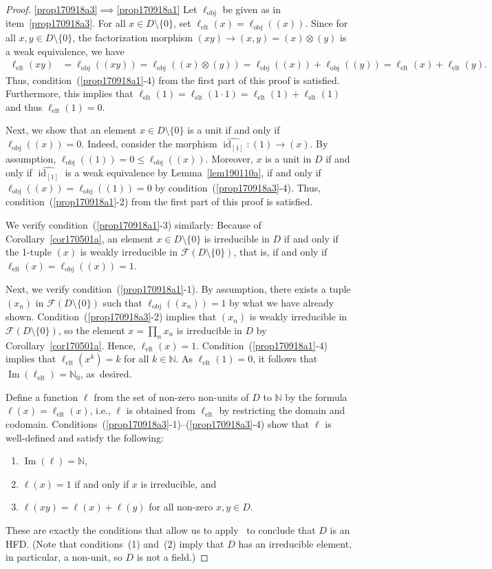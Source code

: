 \documentclass[reqno]{amsart}
\theoremstyle{plain}
\theoremstyle{definition}
\newcommand{\cat}[1]{\mathcal{#1}}
\newcommand{\catf}{\cat{F}}
\newcommand{\id}{\operatorname{id}}
\newcommand{\im}{\operatorname{Im}}
\newcommand{\bbn}{\mathbb{N}}
\renewcommand{\leq}{\leqslant}
\numberwithin{equation}{lem}
\newcommand{\zaks}[1]{\ell_{\text{#1}}}
\newcommand{\zaksobj}{\zaks{obj}}
\newcommand{\zakselt}{\zaks{elt}}
\begin{document}
\begin{proof}
\eqref{prop170918a3}$\implies$\eqref{prop170918a1}
Let $\zaksobj$ be given as in item~\eqref{prop170918a3}.
For all $x\in D\setminus\{0\}$, set $\zakselt(x)=\zaksobj((x))$.
Since for all $x,y\in D\setminus\{0\}$, the factorization morphism $(xy)\to(x,y)=(x)\otimes(y)$ is a weak equivalence,
we have
\begin{align*}
\zakselt(xy)
&=\zaksobj((xy))
=\zaksobj((x)\otimes(y))
=\zaksobj((x))+\zaksobj((y))
=\zakselt(x)+\zakselt(y).
\end{align*}
Thus, condition~(\ref{prop170918a1}-4) from the first part of this proof is satisfied.
Furthermore, this implies that
$\zakselt(1)=\zakselt(1\cdot 1)=\zakselt(1)+\zakselt(1)$
and thus $\zakselt(1)=0$.


Next, we show that an element $x\in D\setminus\{0\}$ is a unit if and only if $\zaksobj((x))=0$. 
Indeed, consider the morphism $\widehat{\id_{[1]}}\colon(1)\to(x)$. 
By assumption, $\zaksobj((1))=0\leq \zaksobj((x))$.
Moreover,  $x$ is a unit in $D$ if and only if $\widehat{\id_{[1]}}$ is a weak equivalence by 
Lemma~\ref{lem190110a},
if and only if $\zaksobj((x))=\zaksobj((1))=0$ by condition~(\ref{prop170918a3}-4).
Thus, condition~(\ref{prop170918a1}-2) from the first part of this proof is satisfied.

We  verify condition~(\ref{prop170918a1}-3) similarly:
Because of Corollary~\ref{cor170501a}, an element $x\in D\setminus\{0\}$ is
irreducible in $D$ if and only if the 1-tuple $(x)$ is 
weakly
irreducible in $\catf(D\setminus\{0\})$,
that is, if and only if $\zakselt(x)=\zaksobj((x))=1$.


Next, we  verify condition~(\ref{prop170918a1}-1).
By assumption, there 
exists
a tuple $(x_n)$ in $\catf(D\setminus\{0\})$ such that $\zaksobj((x_n))=1$
by what we have already shown.
Condition~(\ref{prop170918a3}-2) implies that $(x_n)$ is 
weakly
irreducible in $\catf(D\setminus\{0\})$,
so the element $x=\prod_nx_n$ is irreducible in $D$ by Corollary~\ref{cor170501a}.
Hence, $\zakselt(x)=1$. Condition~(\ref{prop170918a1}-4) implies that $\zakselt(x^k)=k$ for all $k\in\bbn$.
As $\zakselt(1)=0$, it follows that $\im(\zakselt)=\bbn_0$, as~desired.

Define a function $\ell$ from the set of non-zero non-units of $D$ to $\bbn$ by the formula $\ell(x)=\zakselt(x)$,
i.e., $\ell$ is obtained from $\zakselt$ by restricting the domain and codomain.
Conditions~(\ref{prop170918a3}-1)--(\ref{prop170918a3}-4) show that $\ell$ is well-defined and satisfy the following:
\begin{enumerate}[(1)]
\item $\im(\ell)=\bbn$,
\item $\ell(x)=1$ if and only if $x$ is irreducible, and
\item $\ell(xy)=\ell(x)+\ell(y)$ for all non-zero $x,y\in D$.
\end{enumerate}
These are exactly the conditions that allow us to apply~\cite[Lemma~1.3]{zaks} to conclude that $D$ is an HFD.
(Note that conditions~(1) and~(2) imply that $D$ has an irreducible element, in particular, a non-unit, so $D$ is not a field.)
\end{proof}
\end{document}
